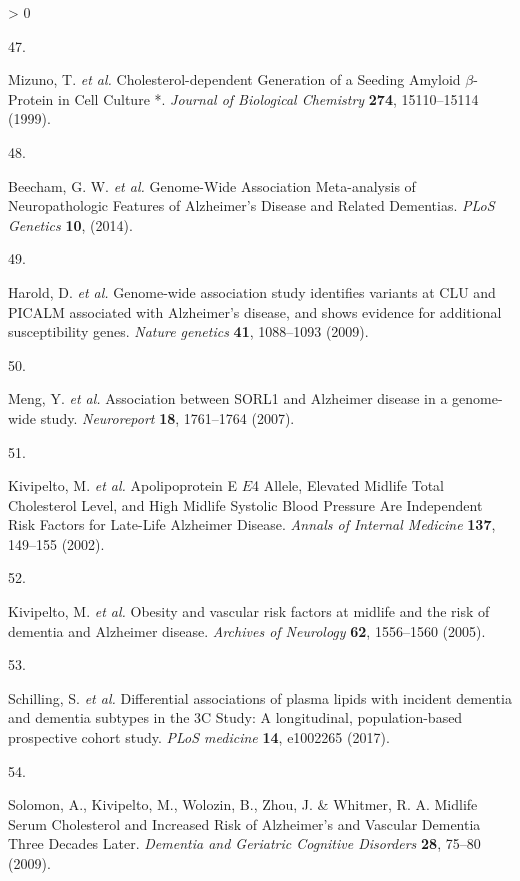 \documentclass[a4paper, twoside]{templates/ociamthesis}
\newlength{\cslhangindent}
\newlength{\csllabelwidth}
\newenvironment{CSLReferences}[3] %
 {%
  \setlength{\parindent}{0pt}
  \ifodd #1 \everypar{\setlength{\hangindent}{\cslhangindent}}\ignorespaces\fi
  \ifnum #2 > 0
  \setlength{\parskip}{#2\baselineskip}
  \fi
 }%
 {}
\newcommand{\CSLLeftMargin}[1]{\parbox[t]{\maxof{\widthof{#1}}{\csllabelwidth}}{#1}}
\newcommand{\CSLRightInline}[1]{\parbox[t]{\linewidth - \csllabelwidth}{#1}}
\begin{document}
\begin{CSLReferences}{0}{0}
\leavevmode\hypertarget{ref-mizuno1999}{}%
\CSLLeftMargin{47. }
\CSLRightInline{Mizuno, T. \emph{et al.} Cholesterol-dependent {Generation} of a {Seeding Amyloid} {\(\beta\)}-{Protein} in {Cell Culture} *. \emph{Journal of Biological Chemistry} \textbf{274}, 15110--15114 (1999).}

\leavevmode\hypertarget{ref-beecham2014}{}%
\CSLLeftMargin{48. }
\CSLRightInline{Beecham, G. W. \emph{et al.} Genome-{Wide Association Meta}-analysis of {Neuropathologic Features} of {Alzheimer}'s {Disease} and {Related Dementias}. \emph{PLoS Genetics} \textbf{10}, (2014).}

\leavevmode\hypertarget{ref-harold2009}{}%
\CSLLeftMargin{49. }
\CSLRightInline{Harold, D. \emph{et al.} Genome-wide association study identifies variants at {CLU} and {PICALM} associated with {Alzheimer}'s disease, and shows evidence for additional susceptibility genes. \emph{Nature genetics} \textbf{41}, 1088--1093 (2009).}

\leavevmode\hypertarget{ref-meng2007}{}%
\CSLLeftMargin{50. }
\CSLRightInline{Meng, Y. \emph{et al.} Association between {SORL1} and {Alzheimer} disease in a genome-wide study. \emph{Neuroreport} \textbf{18}, 1761--1764 (2007).}

\leavevmode\hypertarget{ref-kivipelto2002}{}%
\CSLLeftMargin{51. }
\CSLRightInline{Kivipelto, M. \emph{et al.} Apolipoprotein {E} {\(E\)}4 {Allele}, {Elevated Midlife Total Cholesterol Level}, and {High Midlife Systolic Blood Pressure Are Independent Risk Factors} for {Late}-{Life Alzheimer Disease}. \emph{Annals of Internal Medicine} \textbf{137}, 149--155 (2002).}

\leavevmode\hypertarget{ref-kivipelto2005}{}%
\CSLLeftMargin{52. }
\CSLRightInline{Kivipelto, M. \emph{et al.} Obesity and vascular risk factors at midlife and the risk of dementia and {Alzheimer} disease. \emph{Archives of Neurology} \textbf{62}, 1556--1560 (2005).}

\leavevmode\hypertarget{ref-schilling2017}{}%
\CSLLeftMargin{53. }
\CSLRightInline{Schilling, S. \emph{et al.} Differential associations of plasma lipids with incident dementia and dementia subtypes in the {3C Study}: A longitudinal, population-based prospective cohort study. \emph{PLoS medicine} \textbf{14}, e1002265 (2017).}

\leavevmode\hypertarget{ref-solomon2009}{}%
\CSLLeftMargin{54. }
\CSLRightInline{Solomon, A., Kivipelto, M., Wolozin, B., Zhou, J. \& Whitmer, R. A. Midlife {Serum Cholesterol} and {Increased Risk} of {Alzheimer}'s and {Vascular Dementia Three Decades Later}. \emph{Dementia and Geriatric Cognitive Disorders} \textbf{28}, 75--80 (2009).}


\end{CSLReferences}
\end{document}
